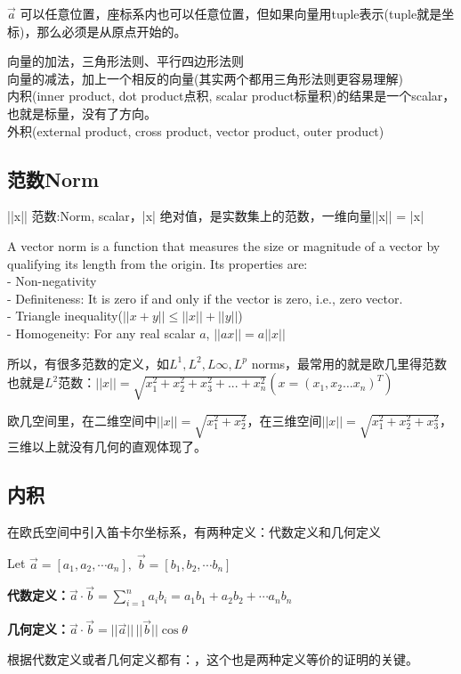 \documentclass[../main.tex]{subfiles}
\begin{document}
$\vec a$ 可以任意位置，座标系内也可以任意位置，但如果向量用tuple表示(tuple就是坐标)，那么必须是从原点开始的。

向量的加法，三角形法则、平行四边形法则\\
向量的减法，加上一个相反的向量(其实两个都用三角形法则更容易理解)\\
内积(inner product, dot product点积, scalar product标量积)的结果是一个scalar，也就是标量，没有了方向。\\
外积(external product, cross product, vector product, outer product)

\subsection{范数Norm}
||x|| 范数:Norm, scalar，|x| 绝对值，是实数集上的范数，一维向量||x|| = |x|

A vector norm is a function that measures the size or magnitude of a vector by qualifying its length from the origin. Its properties are:\\
- Non-negativity\\
- Definiteness: It is zero if and only if the vector is zero, i.e., zero vector.\\
- Triangle inequality($||x+y||\le ||x||+||y||$)\\
- Homogeneity: For any real scalar $a$, $||ax||=a||x||$

所以，有很多范数的定义，如$L^1, L^2, L\infty, L^p$ norms，最常用的就是欧几里得范数也就是$L^2$范数：$||x||= \sqrt{x_1^2+x_2^2+x_3^2+...+x_n^2} (x=(x_1,x_2\ldots x_n)^{T})$

欧几空间里，在二维空间中$||x||=\sqrt{x_1^2+x_2^2}$，在三维空间$||x||=\sqrt{x_1^2+x_2^2+x_3^2}$，三维以上就没有几何的直观体现了。

\subsection{内积}
在欧氏空间中引入笛卡尔坐标系，有两种定义：代数定义和几何定义

Let $\vec a=\left[a_1,a_2,\cdots a_n\right], \; \vec b=\left[b_1,b_2, \cdots b_n\right]$

\textbf{代数定义：}$\vec a \cdot \vec b = \sum_{i=1}^na_ib_i=a_1b_1+a_2b_2+\cdots a_nb_n$

\textbf{几何定义：}$\vec a \cdot \vec b=||\vec a|| \, ||\vec b|| \cos \theta$

根据代数定义或者几何定义都有：，这个也是两种定义等价的证明的关键。
\end{document}
